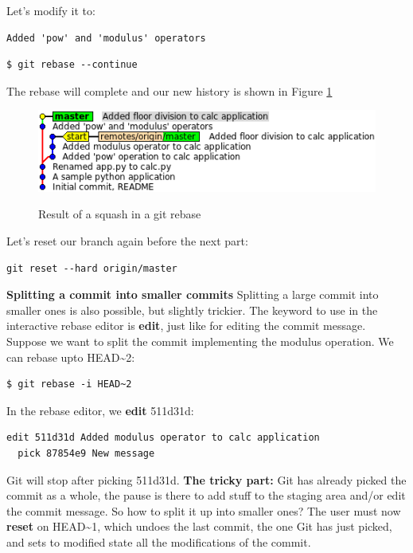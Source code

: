 \documentclass{../../common/tufte-latex/tufte-handout}
\begin{document}
Let's modify it to:

\begin{lstlisting}[style=BashInputStyle]
Added 'pow' and 'modulus' operators
\end{lstlisting}

\begin{lstlisting}[style=BashInputStyle]
  $ git rebase --continue
\end{lstlisting}

The rebase will complete and our new history is shown in Figure \ref{fig:gitrebase-squash}

\begin{figure}%
  \centering
  \includegraphics[width=0.75\linewidth]{gitrebase-squash.png}
  \label{fig:gitrebase-squash}
  \caption{Result of a squash in a git rebase}
\end{figure}

Let's reset our branch again before the next part:

\begin{lstlisting}[style=BashInputStyle]
  git reset --hard origin/master
\end{lstlisting}

\noindent \textbf{Splitting a commit into smaller commits}
Splitting a large commit into smaller ones is also possible, but slightly trickier.
The keyword to use in the interactive rebase editor is \textbf{edit}, just like for editing the commit message.
Suppose we want to split the commit implementing the modulus operation.
We can rebase upto HEAD\textasciitilde2:

\begin{lstlisting}[style=BashInputStyle]
  $ git rebase -i HEAD~2
\end{lstlisting}

In the rebase editor, we \textbf{edit} 511d31d:
\begin{lstlisting}[style=BashInputStyle]
  edit 511d31d Added modulus operator to calc application
  pick 87854e9 New message
\end{lstlisting}

Git will stop after picking 511d31d.
\textbf{The tricky part:} Git has already picked the commit as a whole, the pause is there to add stuff to the staging area and/or edit the commit message.
So how to split it up into smaller ones?
The user must now \textbf{reset} on HEAD\textasciitilde1, which undoes the last commit, the one Git has just picked, and sets to modified state all the modifications of the commit.
\end{document}
